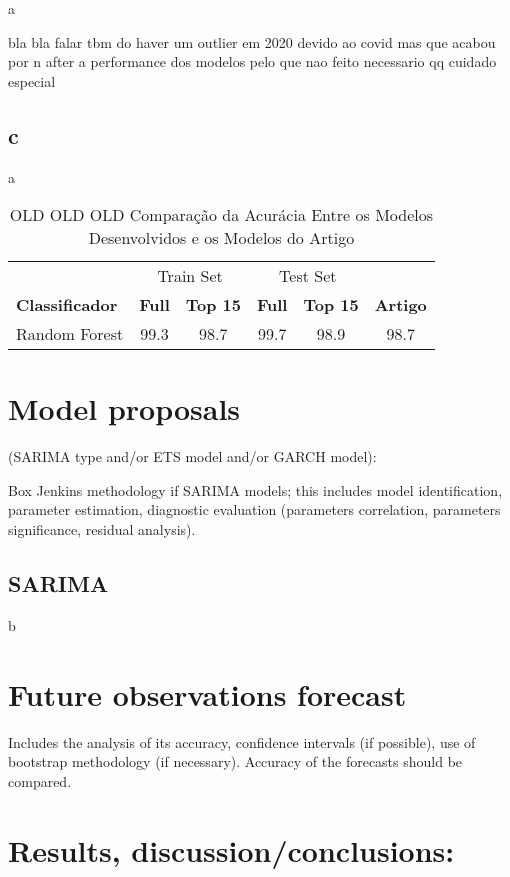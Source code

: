 \documentclass[journal]{IEEEtran}
\begin{document}
a

bla bla falar tbm do haver um outlier em 2020 devido ao covid mas que acabou por n after a performance dos modelos pelo que nao feito necessario qq cuidado especial

\subsection{c}

a

\begin{table}[H]
\centering
\caption{OLD OLD OLD Comparação da Acurácia Entre os Modelos Desenvolvidos e os Modelos do Artigo}
\label{accuracies}
\begin{tabular}{l|cc|cc|c}
\toprule
 & \multicolumn{2}{c|}{Train Set} & \multicolumn{2}{c|}{Test Set} & \\
\textbf{Classificador} & \textbf{Full} & \textbf{Top 15} & \textbf{Full} & \textbf{Top 15} & \textbf{Artigo} \\
\midrule
Random Forest & 99.3 & 98.7 & 99.7 & 98.9 & 98.7 \\
\bottomrule
\end{tabular}
\end{table}

\section{ Model proposals}

 (SARIMA type and/or ETS model and/or GARCH model):

Box  Jenkins methodology if SARIMA models; this includes model identification,
parameter estimation, diagnostic evaluation (parameters correlation,
parameters significance, residual analysis).

\subsection{SARIMA}

b

\section{Future observations forecast}

Includes the analysis of its accuracy, confidence intervals (if possible), use of
bootstrap methodology (if necessary). Accuracy of the forecasts should be
compared.

\section{Results, discussion/conclusions:}
\end{document}
